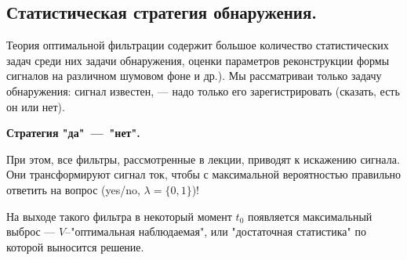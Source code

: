\documentclass[../main/main.tex]{subfiles}
\begin{document}
\subsection{Статистическая стратегия обнаружения.}

Теория оптимальной фильтрации содержит большое количество статистических задач среди них задачи обнаружения, оценки параметров реконструкции формы сигналов на различном шумовом фоне и др.). Мы рассматриваи только задачу обнаружения: сигнал известен, --- надо только его зарегистрировать (сказать, есть он или нет).

\textbf{Стратегия "да"{}~---~"нет".} %

При этом, все фильтры, рассмотренные в лекции, приводят к искажению сигнала. Они трансформируют сигнал ток, чтобы с максимальной вероятностью правильно ответить на вопрос (yes/no, $\lambda = \{0, 1\}$)!

На выходе такого фильтра в некоторый момент $t_0$ появляется максимальный выброс --- $V$--"оптимальная наблюдаемая"{}, или "достаточная статистика" по которой выносится решение.
\end{document}
